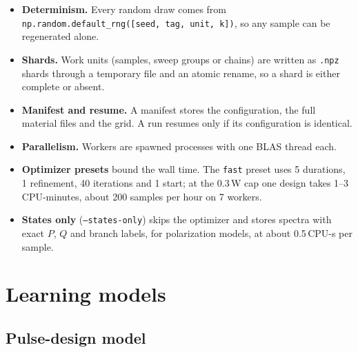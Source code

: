 \documentclass[11pt]{article}
\newcommand{\code}[1]{\texttt{#1}}
\begin{document}
\begin{itemize}
\item \textbf{Determinism.} Every random draw comes from
\code{np.random.default\_rng([seed, tag, unit, k])}, so any sample can be regenerated alone.
\item \textbf{Shards.} Work units (samples, sweep groups or chains) are written as \code{.npz}
shards through a temporary file and an atomic rename, so a shard is either complete or absent.
\item \textbf{Manifest and resume.} A manifest stores the configuration, the full material files
and the grid. A run resumes only if its configuration is identical.
\item \textbf{Parallelism.} Workers are spawned processes with one BLAS thread each.
\item \textbf{Optimizer presets} bound the wall time. The \code{fast} preset uses 5 durations, 1
refinement, 40 iterations and 1 start; at the 0.3\,W cap one design takes 1--3 CPU-minutes, about
200 samples per hour on 7 workers.
\item \textbf{States only} (\code{--states-only}) skips the optimizer and stores spectra with
exact \(P\), \(Q\) and branch labels, for polarization models, at about 0.5\,CPU-s per sample.
\end{itemize}

\section{Learning models}
\label{sec:ml}

\subsection{Pulse-design model}
\end{document}
